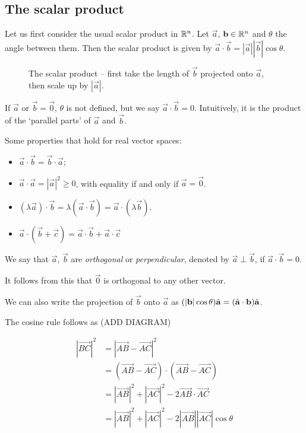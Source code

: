 \documentclass{../template/note}
\begin{document}
    \subsection{The scalar product}

    Let us first consider the usual scalar product in \(\mathbb R^n\). Let \(\vec a\), \(\vec b \in \RR^n\) and \(\theta\) the angle between them. Then the scalar product is given by \(\vec a \cdot \vec b = |\vec a||\vec b| \cos \theta\).

    \begin{figure}[ht]
        \centering
        \caption{The scalar product -- first take the length of \(\vec b\) projected onto \(\vec a\), then scale up by \(|\vec a|\).}
        \label{fig:dot-product}
    \end{figure}
    
    If \(\vec a\) or \(\vec b = \vec 0\), \(\theta\) is not defined, but we say \(\vec a \cdot \vec b = 0\). Intuitively, it is the product of the `parallel parts' of \(\vec a\) and \(\vec b\).

    Some properties that hold for real vector spaces:

    \begin{itemize}
        \item \(\vec a \cdot \vec b = \vec b \cdot \vec a\);
        \item \(\vec a \cdot \vec a = |\vec a|^2 \geq 0\), with equality if and only if \(\vec a = \vec 0\).
        \item \((\lambda \vec a) \cdot \vec b = \lambda (\vec a \cdot \vec b) = \vec a \cdot (\lambda \vec b)\).
        \item \(\vec a \cdot (\vec b + \vec c) = \vec a \cdot \vec b + \vec a \cdot \vec c\)
    \end{itemize}
    
    We say that \(\vec a\), \(\vec b\) are \emph{orthogonal} or \emph{perpendicular}, denoted by \(\vec a \perp \vec b\), if \(\vec a \cdot \vec b = 0\).

    It follows from this that \(\vec 0\) is orthogonal to any other vector.

    We can also write the projection of \(\vec b\) onto \(\vec a\) as \((|\vec b| \cos \theta) \hvec a = (\hvec a \cdot \vec b) \hvec a\).
    
    The cosine rule follows as (ADD DIAGRAM)
    
    \begin{align*}
        |\overrightarrow{BC}|^2 &= |\overrightarrow{AB} - \overrightarrow{AC}|^2 \\
        &= (\overrightarrow{AB} - \overrightarrow{AC}) \cdot (\overrightarrow{AB} - \overrightarrow{AC}) \\
        &= |\overrightarrow{AB}|^2 + |\overrightarrow{AC}|^2 - 2\overrightarrow{AB} \cdot \overrightarrow{AC} \\
        &= |\overrightarrow{AB}|^2 + |\overrightarrow{AC}|^2 - 2|\overrightarrow{AB}|| \overrightarrow{AC}|\cos\theta \\
    \end{align*}
    
\end{document}
